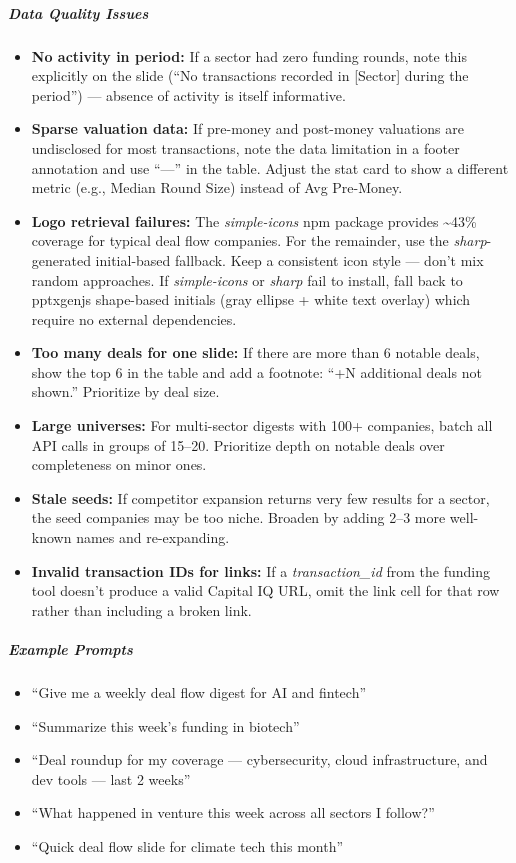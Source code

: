 \documentclass[11pt]{article}
\begin{document}
\subparagraph{Data Quality Issues}\mbox{}\par
\begin{itemize}[leftmargin=*,itemsep=2pt,topsep=2pt]
\item {} \textbf{No activity in period:} If a sector had zero funding rounds, note this explicitly on the slide (``No transactions recorded in [Sector] during the period'') — absence of activity is itself informative.
\item {} \textbf{Sparse valuation data:} If pre-money and post-money valuations are undisclosed for most transactions, note the data limitation in a footer annotation and use ``—'' in the table. Adjust the stat card to show a different metric (e.g., Median Round Size) instead of Avg Pre-Money.
\item {} \textbf{Logo retrieval failures:} The \emph{simple-icons} npm package provides \textasciitilde{}43\% coverage for typical deal flow companies. For the remainder, use the \emph{sharp}-generated initial-based fallback. Keep a consistent icon style — don't mix random approaches. If \emph{simple-icons} or \emph{sharp} fail to install, fall back to pptxgenjs shape-based initials (gray ellipse + white text overlay) which require no external dependencies.
\item {} \textbf{Too many deals for one slide:} If there are more than 6 notable deals, show the top 6 in the table and add a footnote: ``+N additional deals not shown.'' Prioritize by deal size.
\item {} \textbf{Large universes:} For multi-sector digests with 100+ companies, batch all API calls in groups of 15–20. Prioritize depth on notable deals over completeness on minor ones.
\item {} \textbf{Stale seeds:} If competitor expansion returns very few results for a sector, the seed companies may be too niche. Broaden by adding 2–3 more well-known names and re-expanding.
\item {} \textbf{Invalid transaction IDs for links:} If a \emph{transaction\_\allowbreak{}id} from the funding tool doesn't produce a valid Capital IQ URL, omit the link cell for that row rather than including a broken link.
\end{itemize}

\subparagraph{Example Prompts}\mbox{}\par

\begin{itemize}[leftmargin=*,itemsep=2pt,topsep=2pt]
\item {} ``Give me a weekly deal flow digest for AI and fintech''
\item {} ``Summarize this week's funding in biotech''
\item {} ``Deal roundup for my coverage — cybersecurity, cloud infrastructure, and dev tools — last 2 weeks''
\item {} ``What happened in venture this week across all sectors I follow?''
\item {} ``Quick deal flow slide for climate tech this month''
\end{itemize}
\end{document}
